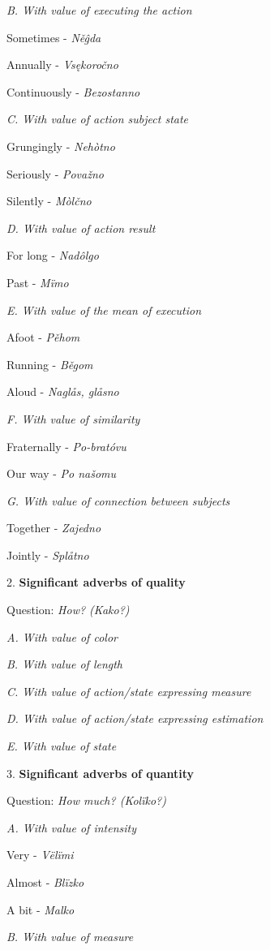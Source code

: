 \textit{B. With value of executing the action}

Sometimes - \textit{Něĝda}

Annually - \textit{Vsękoročno}

Continuously - \textit{Bezostanno}

\textit{C. With value of action subject state}

Grungingly - \textit{Nehòtno}

Seriously - \textit{Považno}

Silently - \textit{Mòlčno}

\textit{D. With value of action result}

For long - \textit{Nadôlgo}

Past - \textit{Mïmo}

\textit{E. With value of the mean of execution}

Afoot - \textit{Pěhom}

Running - \textit{Běgom}

Aloud - \textit{Naglås, glåsno}

\textit{F. With value of similarity}

Fraternally - \textit{Po-bratóvu}

Our way - \textit{Po našomu}

\textit{G. With value of connection between subjects}

Together - \textit{Zajedno}

Jointly - \textit{Splåtno}

2. \textbf{Significant adverbs of quality}

Question: \textit{How? (Kako?)}

\textit{A. With value of color}


\textit{B. With value of length}

\textit{C. With value of action/state expressing measure}

\textit{D. With value of action/state expressing estimation}

\textit{E. With value of state}

3.\textbf{ Significant adverbs of quantity}

Question: \textit{How much? (Kolïko?)}

\textit{A. With value of intensity}

Very - \textit{Vëlïmi}

Almost - \textit{Blïzko}

A bit - \textit{Malko}

\textit{B. With value of measure}

